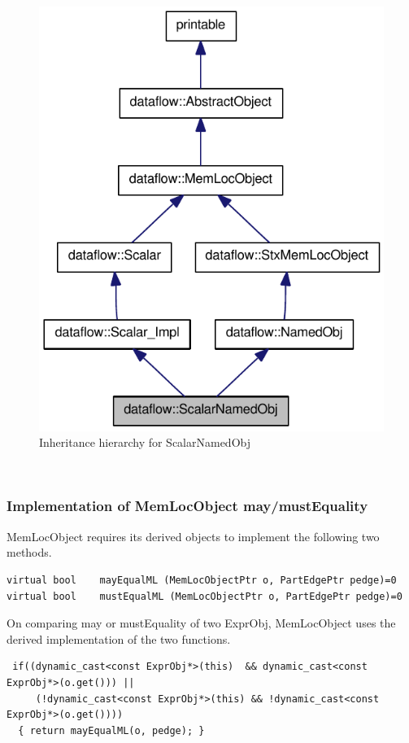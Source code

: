 \documentclass{article}
\begin{document}
\begin{figure}[htb]
\includegraphics{sno-inherit-graph.pdf}
\caption{Inheritance hierarchy for ScalarNamedObj}
\label{fig:sno_inherit_graph}
\end{figure} \\
\subsubsection{Implementation of MemLocObject may/mustEquality}

MemLocObject requires its derived objects to implement the following
two methods. 
\begin{lstlisting}
virtual bool 	mayEqualML (MemLocObjectPtr o, PartEdgePtr pedge)=0
virtual bool 	mustEqualML (MemLocObjectPtr o, PartEdgePtr pedge)=0
\end{lstlisting}
On comparing may or mustEquality of two ExprObj, MemLocObject
uses the derived implementation of the two functions.
\begin{lstlisting}
 if((dynamic_cast<const ExprObj*>(this)  && dynamic_cast<const ExprObj*>(o.get())) ||
     (!dynamic_cast<const ExprObj*>(this) && !dynamic_cast<const ExprObj*>(o.get())))
  { return mayEqualML(o, pedge); }
\end{lstlisting}
\end{document}
